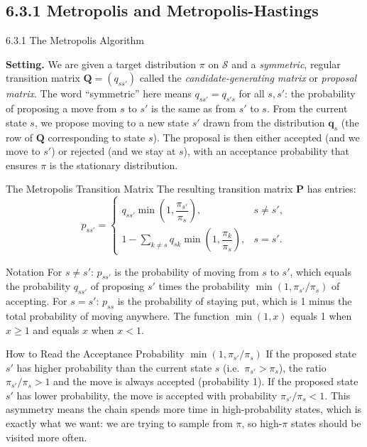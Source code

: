 \documentclass[aspectratio=169,10pt]{beamer}
\newcommand{\bfP}{\mathbf{P}}
\newcommand{\bfQ}{\mathbf{Q}}
\begin{document}
\subsection{6.3.1 Metropolis and Metropolis-Hastings}

\begin{frame}[allowframebreaks]{6.3.1 The Metropolis Algorithm}

\textbf{Setting.}
We are given a target distribution $\pi$ on $\mathcal{S}$ and a \emph{symmetric}, regular transition matrix $\bfQ = (q_{ss'})$ called the \emph{candidate-generating matrix} or \emph{proposal matrix}.
The word ``symmetric'' here means $q_{ss'} = q_{s's}$ for all $s, s'$: the probability of proposing a move from $s$ to $s'$ is the same as from $s'$ to $s$.
From the current state $s$, we propose moving to a new state $s'$ drawn from the distribution $\mathbf{q}_s$ (the row of $\bfQ$ corresponding to state $s$).
The proposal is then either accepted (and we move to $s'$) or rejected (and we stay at $s$), with an acceptance probability that ensures $\pi$ is the stationary distribution.

\begin{block}{The Metropolis Transition Matrix}
The resulting transition matrix $\bfP$ has entries:
\[
  p_{ss'} = \begin{cases}
    q_{ss'} \min\!\left(1, \dfrac{\pi_{s'}}{\pi_s}\right), & s \neq s', \\[6pt]
    1 - \displaystyle\sum_{k \neq s} q_{sk} \min\!\left(1, \dfrac{\pi_k}{\pi_s}\right), & s = s'.
  \end{cases}
\]
\end{block}

\begin{block}{Notation}
For $s \neq s'$: $p_{ss'}$ is the probability of moving from $s$ to $s'$, which equals the probability $q_{ss'}$ of proposing $s'$ times the probability $\min(1, \pi_{s'}/\pi_s)$ of accepting.
For $s = s'$: $p_{ss}$ is the probability of staying put, which is 1 minus the total probability of moving anywhere.
The function $\min(1, x)$ equals 1 when $x \ge 1$ and equals $x$ when $x < 1$.
\end{block}

\begin{alertblock}{How to Read the Acceptance Probability $\min(1, \pi_{s'}/\pi_s)$}
If the proposed state $s'$ has higher probability than the current state $s$ (i.e.\ $\pi_{s'} > \pi_s$), the ratio $\pi_{s'}/\pi_s > 1$ and the move is always accepted (probability 1).
If the proposed state $s'$ has lower probability, the move is accepted with probability $\pi_{s'}/\pi_s < 1$.
This asymmetry means the chain spends more time in high-probability states, which is exactly what we want: we are trying to sample from $\pi$, so high-$\pi$ states should be visited more often.
\end{alertblock}


\end{frame}
\end{document}
